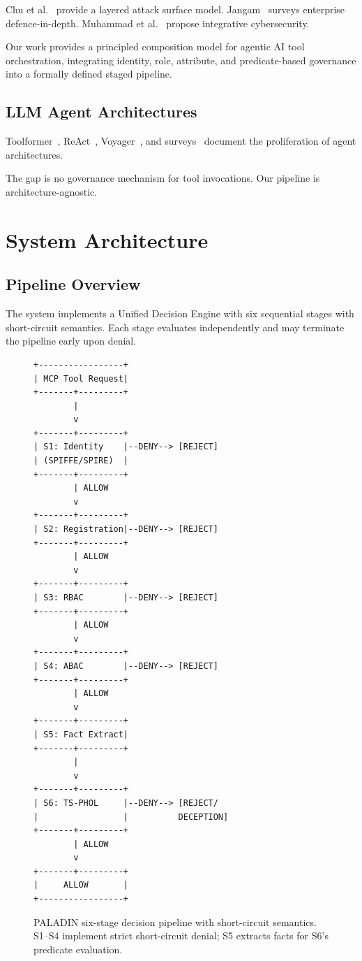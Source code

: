 \documentclass[10pt,a4paper,twocolumn]{article}
\begin{document}
Chu et al.~\cite{chu2026stateless} provide a layered attack surface model. Jangam~\cite{jangam2024comprehensive} surveys enterprise defence-in-depth. Muhammad et al.~\cite{muhammad2024integrative} propose integrative cybersecurity.

Our work provides a principled composition model for agentic AI tool orchestration, integrating identity, role, attribute, and predicate-based governance into a formally defined staged pipeline.

\subsection{LLM Agent Architectures}
\label{sec:llm_architectures}

Toolformer~\cite{schick2023toolformer}, ReAct~\cite{yao2023react}, Voyager~\cite{wang2023voyager}, and surveys~\cite{wang2024survey, xi2025rise} document the proliferation of agent architectures.

The gap is no governance mechanism for tool invocations. Our pipeline is architecture-agnostic.

\section{System Architecture}
\label{sec:architecture}

\subsection{Pipeline Overview}
\label{sec:pipeline_overview}

The system implements a Unified Decision Engine with six sequential stages with short-circuit semantics. Each stage evaluates independently and may terminate the pipeline early upon denial.

\begin{figure}[!t]
\centering
\scriptsize
\begin{verbatim}
+-----------------+
| MCP Tool Request|
+-------+---------+
        |
        v
+-------+---------+
| S1: Identity    |--DENY--> [REJECT]
| (SPIFFE/SPIRE)  |
+-------+---------+
        | ALLOW
        v
+-------+---------+
| S2: Registration|--DENY--> [REJECT]
+-------+---------+
        | ALLOW
        v
+-------+---------+
| S3: RBAC        |--DENY--> [REJECT]
+-------+---------+
        | ALLOW
        v
+-------+---------+
| S4: ABAC        |--DENY--> [REJECT]
+-------+---------+
        | ALLOW
        v
+-------+---------+
| S5: Fact Extract|
+-------+---------+
        |
        v
+-------+---------+
| S6: TS-PHOL     |--DENY--> [REJECT/
|                 |          DECEPTION]
+-------+---------+
        | ALLOW
        v
+-------+---------+
|     ALLOW       |
+-----------------+
\end{verbatim}
\caption{PALADIN six-stage decision pipeline with short-circuit semantics. S1--S4 implement strict short-circuit denial; S5 extracts facts for S6's predicate evaluation.}
\label{fig:pipeline}
\end{figure}
\end{document}
